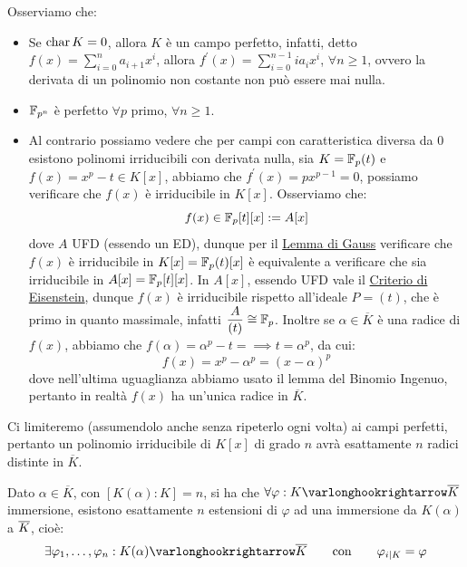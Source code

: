 \documentclass[11pt]{scrartcl}
\begin{document}
\begin{remark}
    Osserviamo che:
    \begin{itemize}
        \item Se $\text{char}\, K = 0$, allora $K$ è un campo perfetto, infatti, detto $f(x) = \sum_{i=0}^n a_{i+1}x^i$, allora $f^{\prime}(x) = \sum_{i=0}^{n-1} ia_ix^i$, $\forall n \geq 1$, ovvero la derivata di un polinomio non 
        costante non può essere mai nulla.
        \item $\mathbb{F}_{p^{n}}$ è perfetto $\forall p$ primo, $\forall n \geq 1$.
        \item Al contrario possiamo vedere che per campi con caratteristica diversa da 0 esistono polinomi irriducibili con derivata nulla, sia $K = {\mathbb F}_p(t)$ e $f(x) = x^p - t \in K[x]$, abbiamo che $f^{\prime}(x) = px^{p-1} = 0$,
        possiamo verificare che $f(x)$ è irriducibile in $K[x]$. Osserviamo che:
        \[ f(x) \in {\mathbb F}_p[t][x] := A[x]
            \]
        dove $A$ UFD (essendo un ED), dunque per il \hyperref[gauss]{Lemma di Gauss} verificare che $f(x)$ è irriducibile in $K[x] = {\mathbb F}_p(t)[x]$ è equivalente a verificare che sia irriducibile in $A[x] = {\mathbb F}_p[t][x]$.
        In $A[x]$, essendo UFD vale il \hyperref[eisenstein]{Criterio di Eisenstein}, dunque $f(x)$ è irriducibile rispetto all'ideale $P = (t)$, che è primo in quanto massimale, infatti $\displaystyle\frac{A}{(t)} \cong {\mathbb F}_p$.
        Inoltre se $\alpha \in \overline K$ è una radice di $f(x)$, abbiamo che $f(\alpha) = \alpha^p - t = \implies t = \alpha^p$, da cui:
        \[ f(x) = x^p - \alpha^p = (x - \alpha)^p
            \]
        dove nell'ultima uguaglianza abbiamo usato il lemma del Binomio Ingenuo, pertanto in realtà $f(x)$ ha un'unica radice in $\overline K$.
    \end{itemize}
\end{remark}

Ci limiteremo (assumendolo anche senza ripeterlo ogni volta) ai campi perfetti, pertanto un polinomio irriducibile di $K[x]$ di grado $n$ avrà esattamente $n$ radici distinte in $\overline K$.

\begin{proposition}
    \label{3.37}
    Dato $\alpha \in \overline K$, con $[K(\alpha) : K] = n$, si ha che $\forall \varphi : K \varlonghookrightarrow \overline K$ immersione, esistono esattamente $n$ estensioni di $\varphi$ ad una immersione da $K(\alpha)$ a $\overline K$, cioè:
    \[ \exists \varphi_1,\ldots,\varphi_n : K(\alpha) \varlonghookrightarrow \overline K \qquad \text{con} \qquad \varphi_{i|K} = \varphi
        \]
\end{proposition}
\end{document}
